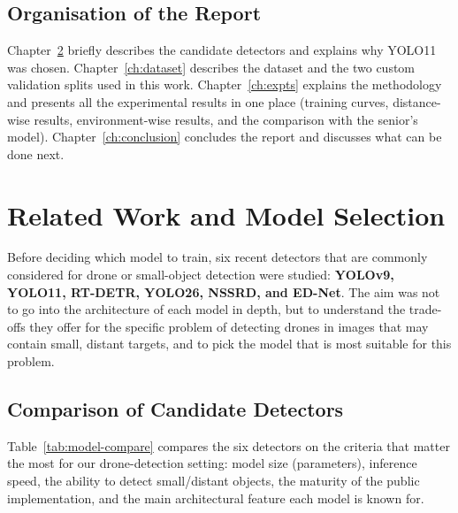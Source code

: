 \documentclass[12pt,a4paper]{report}
\begin{document}
\section{Organisation of the Report}
Chapter~\ref{ch:related} briefly describes the candidate detectors and explains
why YOLO11 was chosen. Chapter~\ref{ch:dataset} describes the dataset and the
two custom validation splits used in this work. Chapter~\ref{ch:expts} explains
the methodology and presents all the experimental results in one place
(training curves, distance-wise results, environment-wise results, and the
comparison with the senior's model). Chapter~\ref{ch:conclusion} concludes the
report and discusses what can be done next.

\chapter{Related Work and Model Selection}
\label{ch:related}

Before deciding which model to train, six recent detectors that are commonly
considered for drone or small-object detection were studied:
\textbf{YOLOv9, YOLO11, RT-DETR, YOLO26, NSSRD, and ED-Net}. The aim was not to
go into the architecture of each model in depth, but to understand the trade-offs
they offer for the specific problem of detecting drones in images that may
contain small, distant targets, and to pick the model that is most suitable for
this problem.

\section{Comparison of Candidate Detectors}
Table~\ref{tab:model-compare} compares the six detectors on the criteria that
matter the most for our drone-detection setting: model size (parameters),
inference speed, the ability to detect small/distant objects, the maturity of
the public implementation, and the main architectural feature each model is
known for.
\end{document}
